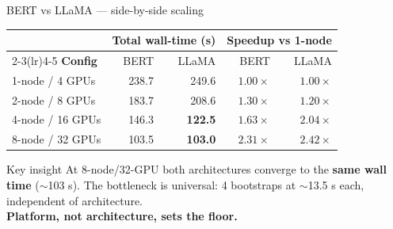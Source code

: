 \documentclass[aspectratio=169]{beamer}
\begin{document}
\begin{frame}{BERT vs LLaMA — side-by-side scaling}
  \begin{center}
  \begin{tabular}{@{}lrrrr@{}}
    \toprule
    & \multicolumn{2}{c}{\textbf{Total wall-time (s)}} & \multicolumn{2}{c}{\textbf{Speedup vs 1-node}} \\
    \cmidrule(lr){2-3}\cmidrule(lr){4-5}
    \textbf{Config} & BERT & LLaMA & BERT & LLaMA \\
    \midrule
    1-node / 4 GPUs  & 238.7 & 249.6 & $1.00\times$ & $1.00\times$ \\
    2-node / 8 GPUs  & 183.7 & 208.6 & $1.30\times$ & $1.20\times$ \\
    4-node / 16 GPUs & 146.3 & \textbf{122.5} & $1.63\times$ & $\mathbf{2.04\times}$ \\
    8-node / 32 GPUs & 103.5 & \textbf{103.0} & $2.31\times$ & $\mathbf{2.42\times}$ \\
    \bottomrule
  \end{tabular}
  \end{center}
  \vspace{0.5em}
  \begin{alertblock}{Key insight}
    \small
    At 8-node/32-GPU both architectures converge to the \textbf{same wall time}
    ($\sim$103 s). The bottleneck is universal: 4 bootstraps at
    $\sim$13.5 s each, independent of architecture.\\[0.3em]
    \textbf{Platform, not architecture, sets the floor.}
  \end{alertblock}
\end{frame}
\end{document}
